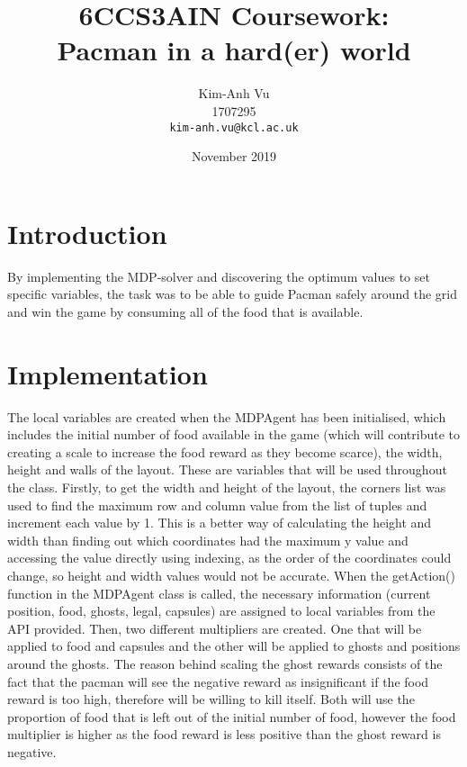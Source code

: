 \documentclass[12pt]{report}
\title{6CCS3AIN Coursework: \\ Pacman in a hard(er) world}
\author{
  Kim-Anh Vu\\1707295\\
  \texttt{kim-anh.vu@kcl.ac.uk}
}
\date{November 2019}
\begin{document}
  \begin{titlepage}
    \maketitle
  \end{titlepage}
  \section*{Introduction}
    By implementing the MDP-solver and discovering the optimum values to set specific
    variables, the task was to be able to guide Pacman safely around the grid and
    win the game by consuming all of the food that is available.
    \vspace{-5mm}
    \section*{Implementation}
      The local variables are created when the MDPAgent has been initialised, which includes the initial number of food available in the game (which will contribute to creating a scale to increase the food reward as they become scarce), the width, height and walls of the layout. These are variables that will be used throughout the class.
      \newline \newline
      Firstly, to get the width and height of the layout, the corners list was used to find the maximum row and column value from the list of tuples and increment each value by 1. This is a better way of calculating the height and width than finding out which coordinates had the maximum y value and accessing the value directly using indexing, as the order of the coordinates could change, so height and width values would not be accurate.
      \newline \newline
      When the getAction() function in the MDPAgent class is called, the necessary information (current position, food, ghosts, legal, capsules) are assigned to local variables from the API provided.
      \newline \newline
      Then, two different multipliers are created. One that will be applied to food and capsules and the other will be applied to ghosts and positions around the ghosts. The reason behind scaling the ghost rewards consists of the fact that the pacman will see the negative reward as insignificant if the food reward is too high, therefore will be willing to kill itself. Both will use the proportion of food that is left out of the initial number of food, however the food multiplier is higher as the food reward is less positive than the ghost reward is negative.
\end{document}
